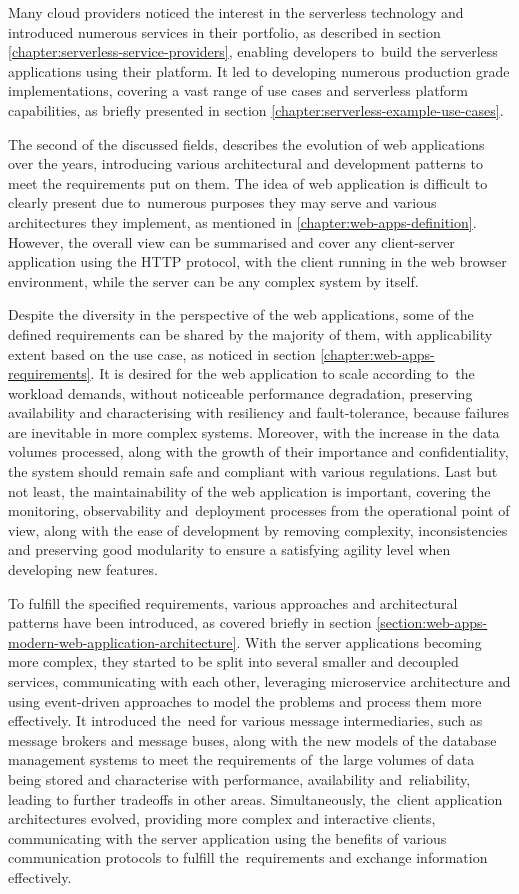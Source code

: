 Many cloud providers noticed the interest in the serverless technology and introduced numerous services in their portfolio, as described in section \ref{chapter:serverless-service-providers}, enabling developers to~build the serverless applications using their platform.
It led to developing numerous production grade implementations, covering a vast range of use cases and serverless platform capabilities, as briefly presented in section \ref{chapter:serverless-example-use-cases}.

The second of the discussed fields, describes the evolution of web applications over the years, introducing various architectural and development patterns to meet the requirements put on them.
The idea of web application is difficult to clearly present due to~numerous purposes they may serve and various architectures they implement, as mentioned in \ref{chapter:web-apps-definition}. However, the overall view can be summarised and cover any client-server application using the HTTP protocol, with the client running in the web browser environment, while the server can be any complex system by itself.

Despite the diversity in the perspective of the web applications, some of the defined requirements can be shared by the majority of them, with applicability extent based on the use case, as noticed in section \ref{chapter:web-apps-requirements}.
It is desired for the web application to scale according to~the workload demands, without noticeable performance degradation, preserving availability and characterising with resiliency and fault-tolerance, because failures are inevitable in more complex systems. Moreover, with the increase in the data volumes processed, along with the growth of their importance and confidentiality, the system should remain safe and compliant with various regulations. Last but not least, the maintainability of the web application is important, covering the monitoring, observability and~deployment processes from the operational point of view, along with the ease of development by removing complexity, inconsistencies and preserving good modularity to ensure a satisfying agility level when developing new features.

To fulfill the specified requirements, various approaches and architectural patterns have been introduced, as covered briefly in section \ref{section:web-apps-modern-web-application-architecture}.
With the server applications becoming more complex, they started to be split into several smaller and decoupled services, communicating with each other, leveraging microservice architecture and using event-driven approaches to model the problems and process them more effectively.
It introduced the~need for various message intermediaries, such as message brokers and message buses, along with the new models of the database management systems to meet the requirements of~the large volumes of data being stored and characterise with performance, availability and~reliability, leading to further tradeoffs in other areas.
Simultaneously, the~client application architectures evolved, providing more complex and interactive clients, communicating with the server application using the benefits of various communication protocols to fulfill the~requirements and exchange information effectively.

